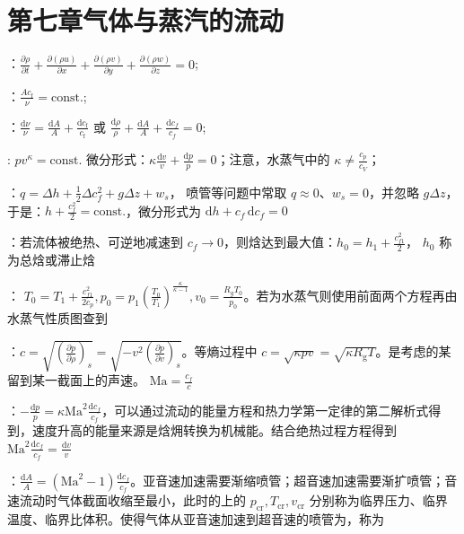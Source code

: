 \section{第七章\quad 气体与蒸汽的流动}


：$\frac{\partial\rho}{\partial t}+\frac{\partial(\rho u)}{\partial x}+\frac{\partial(\rho v)}{\partial y}+\frac{\partial(\rho w)}{\partial z}=0$;

：$\frac{Ac_\mathrm{f}}{\nu}=\text{const.}$;

：$\frac{\mathrm{d}\nu}{\nu}=\frac{\mathrm{d}A}{A}+\frac{\mathrm{d}c_\mathrm{f}}{c_\mathrm{f}}$ 或 $\frac{\mathrm{d}\rho}{\rho}+\frac{\mathrm{d}A}{A}+\frac{\mathrm{d}c_f}{c_f}=0$;

: $pv^\kappa=\mathrm{const.}$ 微分形式：$\kappa\frac{\mathrm{d}v}{v}+\frac{\mathrm{d}p}{p}=0$；注意，水蒸气中的 $\kappa\ne \frac{c_p}{c_V}$；

：$q=\Delta h+\frac{1}{2}\Delta c_f^2+g\Delta z+w_s$， 喷管等问题中常取 $q\approx 0$、$w_s=0$，并忽略 $g\Delta z$，于是：$h+\frac{c_f^2}{2}=\mathrm{const.}$，微分形式为 $\mathrm{d}h+c_f\,\mathrm{d}c_f=0$

：若流体被绝热、可逆地减速到 $c_f\to 0$，则焓达到最大值：$h_0=h_1+\frac{c_{f1}^2}{2}$， $h_0$ 称为总焓或滞⽌焓

： $T_0=T_1+\frac{c_{f1}^2}{2c_p},p_0=p_1\left(\frac{T_0}{T_1}\right)^{\frac{\kappa}{\kappa-1}},v_0=\frac{R_gT_0}{p_0}$。若为水蒸气则使用前面两个方程再由水蒸气性质图查到

：$c=\sqrt{\left(\frac{\partial p}{\partial \rho}\right)_s}=\sqrt{-v^2\left(\frac{\partial p}{\partial v}\right)_s}$。等熵过程中 $c=\sqrt{\kappa pv}=\sqrt{\kappa R_\mathrm{g}T}$。是考虑的某留到某一截面上的声速。 $\mathrm{Ma}=\frac{c_f}{c}$

\divider

：$-\frac{\mathrm{d}p}{p}=\kappa \mathrm{Ma}^2\frac{\mathrm{d}c_f}{c_f}$，可以通过流动的能量方程和热力学第一定律的第二解析式得到，速度升高的能量来源是焓㶲转换为机械能。结合绝热过程方程得到 $\mathrm{Ma}^2\frac{\mathrm{d}c_f}{c_f}=\frac{\mathrm{d}v}{v}$

：$\frac{\mathrm{d}A}{A}=\left(\mathrm{Ma}^2-1\right)\frac{\mathrm{d}c_f}{c_f}$。亚音速加速需要渐缩喷管；超音速加速需要渐扩喷管；音速流动时气体截面收缩至最小，此时的上的 $p_{\mathrm{cr}},T_{\mathrm{cr}},v_{\mathrm{cr}}$ 分别称为临界压力、临界温度、临界比体积。使得气体从亚音速加速到超音速的喷管为，称为

